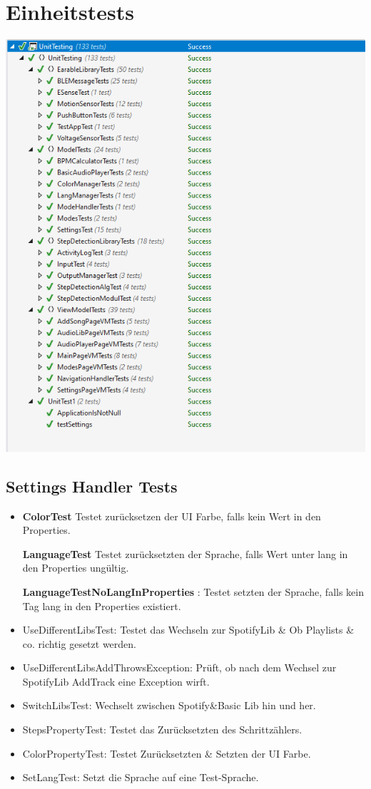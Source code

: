 \documentclass[../validierung.tex]{subfiles}
\begin{document}
	\section{Einheitstests}
		\includegraphics[width=\textwidth]{alleok.png}
		\subsection{Settings Handler Tests}
			\begin{itemize}
				\item\textbf{ColorTest} Testet zurücksetzen der UI Farbe, falls kein Wert in den Properties.
				\item[\textbf{LanguageTest}] Testet zurücksetzten der Sprache, falls Wert unter lang in den Properties ungültig.
				\item[\textbf{LanguageTestNoLangInProperties}]: Testet setzten der Sprache, falls kein Tag lang in den Properties existiert.
				\item UseDifferentLibsTest: Testet das Wechseln zur SpotifyLib \& Ob Playlists \& co. richtig gesetzt werden.
				\item UseDifferentLibsAddThrowsException: Prüft, ob nach dem Wechsel zur SpotifyLib AddTrack eine Exception wirft.
				\item SwitchLibsTest: Wechselt zwischen Spotify{\&}Basic Lib hin und her.
				\item StepsPropertyTest: Testet das Zurücksetzten des Schrittzählers.
				\item ColorPropertyTest: Testet Zurücksetzten \& Setzten der UI Farbe.
				\item SetLangTest: Setzt die Sprache auf eine Test-Sprache.
			\end{itemize}
\end{document}
